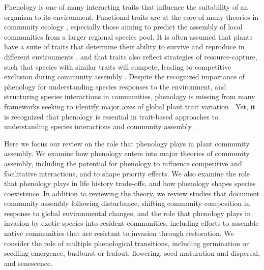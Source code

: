 \documentclass[11pt]{article}
\begin{document}
Phenology is one of many interacting traits that influence the suitability of an organism to its environment. Functional traits are at the core of many theories in community ecology \citep[with the key exception of neutral theories, e.g.][]{hubbell2005neutral}, especially those aiming to predict the assembly of local communities from a larger regional species pool. It is often assumed that plants have a suite of traits that determine their ability to survive and reproduce in different environments \citep{schimper1902plant}, and that traits also reflect strategies of resource-capture, such that species with similar traits will compete, leading to competitive exclusion during community assembly \citep{gause1932experimental,macarthur1967limiting,abrams1983theory}. Despite the recognized importance of phenology for understanding species responses to the environment, and structuring species interactions in communities, phenology is missing from many frameworks seeking to identify major axes of global plant trait variation \citep[e.g.][]{westoby1998leaf,wright2004worldwide,diaz2016global,joswig2022climatic}. Yet, it is recognized that phenology is essential in trait-based approaches to understanding species interactions and community assembly \citep{cope2022role}.

Here we focus our review on the role that phenology plays in plant community assembly. We examine how phenology enters into major theories of community assembly, including the potential for phenology to influence competitive and facilitative interactions, and to shape priority effects. We also examine the role that phenology plays in life history trade-offs, and how phenology shapes species coexistence. In addition to reviewing the theory, we review studies that document community assembly following disturbance, shifting community composition in response to global environmental changes, and the role that phenology plays in invasion by exotic species into resident communities, including efforts to assemble native communities that are resistant to invasion through restoration. We consider the role of multiple phenological transitions, including germination or seedling emergence, budburst or leafout, flowering, seed maturation and dispersal, and senescence.
\end{document}
